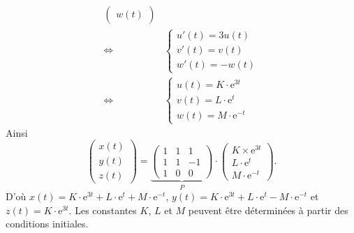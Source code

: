 \begin{exo}
\begin{enumerate}
\begin{align*}
\begin{pmatrix}
					w(t)
				\end{pmatrix}\\
				\iff& \begin{cases}
					u'(t) = 3u(t)\\
					v'(t) = v(t)\\
					w'(t) = -w(t)
				\end{cases}\\
				\iff& \begin{cases}
					u(t) = K \cdot \mathrm{e}^{3t}\\
					v(t) = L \cdot \mathrm{e}^{t}\\
					w(t) = M \cdot \mathrm{e}^{-t}
				\end{cases}
			\end{align*}
			Ainsi \[
				\begin{pmatrix}
					x(t)\\
					y(t)\\
					z(t)
				\end{pmatrix} = \underbrace{\begin{pmatrix}
					1&1&1\\
					1&1&-1\\
					1&0&0
				\end{pmatrix}}_P \cdot \begin{pmatrix}
					K \times \mathrm{e}^{3t}\\
					L \cdot \mathrm{e}^{t}\\
					M \cdot \mathrm{e}^{-t}
				\end{pmatrix}
			.\] 
			D'où $x(t) = K\cdot \mathrm{e}^{3t} + L \cdot \mathrm{e}^{t} + M \cdot \mathrm{e}^{-t}$, $y(t) = K \cdot \mathrm{e}^{3t} + L \cdot \mathrm{e}^{t} - M \cdot \mathrm{e}^{-t}$\/ et $z(t) = K\cdot \mathrm{e}^{3t}$. Les constantes $K$, $L$\/ et $M$\/ peuvent être déterminées à partir des conditions initiales.
	\end{enumerate}
\end{exo}

